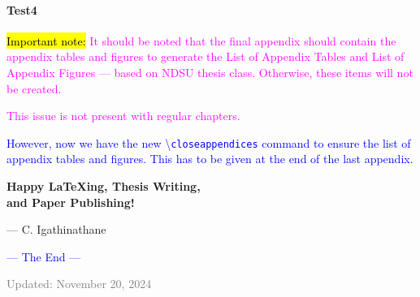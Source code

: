 \documentclass[phd]{ndsu-thesis-2022}
\newcommand\italk[1]{\textcolor{blue}{#1}}  %
\newcommand\cmd[1]{\textbackslash\texttt{#1}}  %
\begin{document}
\paragraph{Test4}

{\hl{Important note:}
\textcolor{magenta}{It should be noted that the final appendix should contain the appendix tables and figures to generate the List of Appendix Tables and List of Appendix Figures --- based on NDSU thesis class. Otherwise, these items will not be created.}
} 

\textcolor{magenta}{This issue is not present with regular chapters.}

\italk{However, now we have the new \cmd{closeappendices} command to ensure the list of appendix tables and figures. This has to be given at the end of the last appendix.}

\vspace{1cm}
\begin{center}
{\LARGE\bfseries
Happy {\LaTeX}ing, Thesis Writing, \\
and Paper Publishing!
}
\end{center}

\hfill {\footnotesize --- C. Igathinathane}

\vspace{0.1in}
\begin{center}
\italk{--- The End ---}
\end{center}

\vfill
{\noindent\scriptsize\textcolor{gray}{Updated: November 20, 2024}}

\closeappendices  %
\end{document}
